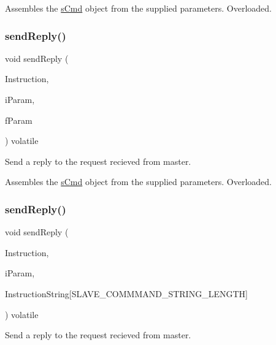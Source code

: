 Assembles the \mbox{\hyperlink{structs_cmd}{s\+Cmd}} object from the supplied parameters. Overloaded. \mbox{\label{class_master_aa0f969c879b7d6ca105162ea2ca2c87e}} 
\subsubsection{\texorpdfstring{sendReply()}{sendReply()}\hspace{0.1cm}{\footnotesize\ttfamily [6/9]}}
{\footnotesize\ttfamily void send\+Reply (\begin{DoxyParamCaption}\item[{const \mbox{\hyperlink{_s_p_i___instruction_set_8h_a949ec019a0f52780dcdd7d5a5ba73e47}{s\+Instruct}}}]{Instruction,  }\item[{const int}]{i\+Param,  }\item[{const int}]{f\+Param }\end{DoxyParamCaption}) volatile}



Send a reply to the request recieved from master. 

Assembles the \mbox{\hyperlink{structs_cmd}{s\+Cmd}} object from the supplied parameters. Overloaded. \mbox{\label{class_master_a075da7da71f50da0a5973ff65cc1a485}} 
\subsubsection{\texorpdfstring{sendReply()}{sendReply()}\hspace{0.1cm}{\footnotesize\ttfamily [7/9]}}
{\footnotesize\ttfamily void send\+Reply (\begin{DoxyParamCaption}\item[{\mbox{\hyperlink{_s_p_i___instruction_set_8h_a949ec019a0f52780dcdd7d5a5ba73e47}{s\+Instruct}}}]{Instruction,  }\item[{int}]{i\+Param,  }\item[{volatile char}]{Instruction\+String\mbox{[}\+S\+L\+A\+V\+E\+\_\+\+C\+O\+M\+M\+M\+A\+N\+D\+\_\+\+S\+T\+R\+I\+N\+G\+\_\+\+L\+E\+N\+G\+T\+H\mbox{]} }\end{DoxyParamCaption}) volatile}



Send a reply to the request recieved from master. 

